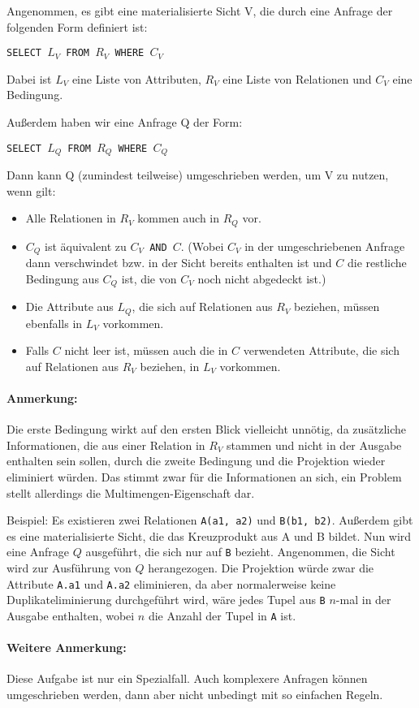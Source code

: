 \begin{enumerate}[a)]
\begin{solution}
Angenommen, es gibt eine materialisierte Sicht V, die durch eine Anfrage der
folgenden Form definiert ist:

  \texttt{SELECT $L_V$ FROM $R_V$ WHERE $C_V$}

Dabei ist $L_V$ eine Liste von Attributen, $R_V$ eine Liste von Relationen
und $C_V$ eine Bedingung.

Außerdem haben wir eine Anfrage Q der Form:

  \texttt{SELECT $L_Q$ FROM $R_Q$ WHERE $C_Q$}

Dann kann Q (zumindest teilweise) umgeschrieben werden, um V zu nutzen, wenn gilt:

  \begin{itemize}
    \item Alle Relationen in $R_V$ kommen auch in $R_Q$ vor.
    \item $C_Q$ ist äquivalent zu \texttt{$C_V$ AND $C$}.
      (Wobei $C_V$ in der umgeschriebenen Anfrage dann verschwindet bzw.
      in der Sicht bereits enthalten ist und $C$ die restliche Bedingung
      aus $C_Q$ ist, die von $C_V$ noch nicht abgedeckt ist.)
    \item Die Attribute aus $L_Q$, die sich auf Relationen aus $R_V$
      beziehen, müssen ebenfalls in $L_V$ vorkommen.
    \item Falls $C$ nicht leer ist,
       müssen auch die in $C$ verwendeten Attribute,
       die sich auf Relationen aus $R_V$ beziehen, in $L_V$ vorkommen.
    \end{itemize}

\paragraph{\color{solutioncolor}Anmerkung:}
Die erste Bedingung wirkt auf den ersten Blick vielleicht unnötig,
da zusätzliche Informationen,
die aus einer Relation in $R_V$ stammen und
nicht in der Ausgabe enthalten sein sollen,
durch die zweite Bedingung und die Projektion wieder eliminiert würden.
Das stimmt zwar für die Informationen an sich,
ein Problem stellt allerdings die Multimengen-Eigenschaft dar.

Beispiel: Es existieren zwei Relationen
\texttt{A(a1, a2)} und \texttt{B(b1, b2)}.
Außerdem gibt es eine materialisierte Sicht,
die das Kreuzprodukt aus A und B bildet.
Nun wird eine Anfrage $Q$ ausgeführt, die sich nur auf \texttt{B} bezieht.
Angenommen, die Sicht wird zur Ausführung von $Q$ herangezogen.
Die Projektion würde zwar die Attribute \texttt{A.a1} und
\texttt{A.a2} eliminieren,
da aber normalerweise keine Duplikateliminierung durchgeführt wird,
wäre jedes Tupel aus \texttt{B} $n$-mal in der Ausgabe enthalten,
wobei $n$ die Anzahl der Tupel in \texttt{A} ist.

\paragraph{\color{solutioncolor}Weitere Anmerkung:}
Diese Aufgabe ist nur ein Spezialfall.
Auch komplexere Anfragen können umgeschrieben werden,
dann aber nicht unbedingt mit so einfachen Regeln.
\end{solution}

\end{enumerate}
